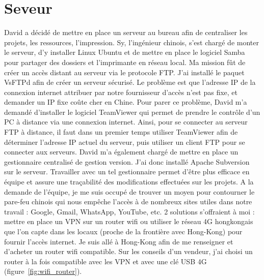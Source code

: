\documentclass[a4paper, 11pt]{report}
\begin{document}
\section{Seveur}
David a décidé de mettre en place un serveur au bureau afin de centraliser les projets, les ressources, l’impression. Sy, l’ingénieur chinois, s’est chargé de monter le serveur, d’y installer Linux Ubuntu et de mettre en place le logiciel Samba pour partager des dossiers et l’imprimante en réseau local. Ma mission fût de créer un accès distant au serveur via le protocole FTP. J’ai installé le paquet VsFTPd afin de créer un serveur sécurisé. Le problème est que l’adresse IP de la connexion internet attribuer par notre fournisseur d’accès n’est pas fixe, et demander un IP fixe coûte cher en Chine. Pour parer ce problème, David m’a demandé d’installer le logiciel TeamViewer qui permet de prendre le contrôle d’un PC à distance via une connexion internet. Ainsi, pour se connecter au serveur FTP à distance, il faut dans un premier temps utiliser TeamViewer afin de déterminer l’adresse IP actuel du serveur, puis utiliser un client FTP pour se connecter aux serveurs.
David m’a également chargé de mettre en place un gestionnaire centralisé de gestion version. J’ai donc installé Apache Subversion sur le serveur. Travailler avec un tel gestionnaire permet d’être plus efficace en équipe et assure une traçabilité des modifications effectuées sur les projets.
A la demande de l’équipe, je me suis occupé de trouver un moyen pour contourner le pare-feu chinois qui nous empêche l’accès à de nombreux sites utiles dans notre travail : Google, Gmail, WhatsApp, YouTube, etc. 2 solutions s’offraient à moi : mettre en place un VPN sur un router wifi ou utiliser le réseau 4G hongkongais que l’on capte dans les locaux (proche de la frontière avec Hong-Kong) pour fournir l’accès internet. Je suis allé à Hong-Kong afin de me renseigner et d’acheter un router wifi compatible. Sur les conseils d’un vendeur, j’ai choisi un router à la fois compatible avec les VPN et avec une clé USB 4G (figure~\ref{fig:wifi_router}).
\end{document}
